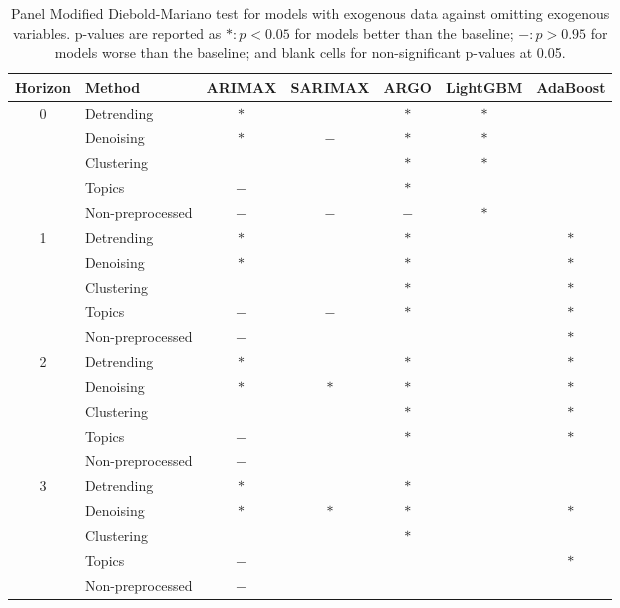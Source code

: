 \begin{table}[H]
\centering
\begin{tabular}{clccccc}
\toprule
Horizon & Method & ARIMAX & SARIMAX & ARGO & LightGBM & AdaBoost \\
\midrule
\multirow{5}{*}{0} & Detrending & $*$ &  & $*$ & $*$ &  \\
 & Denoising & $*$ & $-$ & $*$ & $*$ &  \\
 & Clustering &  &  & $*$ & $*$ &  \\
 & Topics & $-$ &  & $*$ &  &  \\
 & Non-preprocessed & $-$ & $-$ & $-$ & $*$ &  \\
\midrule
\multirow{5}{*}{1} & Detrending & $*$ &  & $*$ &  & $*$ \\
 & Denoising & $*$ &  & $*$ &  & $*$ \\
 & Clustering &  &  & $*$ &  & $*$ \\
 & Topics & $-$ & $-$ & $*$ &  & $*$ \\
 & Non-preprocessed & $-$ &  &  &  & $*$ \\
\midrule
\multirow{5}{*}{2} & Detrending & $*$ &  & $*$ &  & $*$ \\
 & Denoising & $*$ & $*$ & $*$ &  & $*$ \\
 & Clustering &  &  & $*$ &  & $*$ \\
 & Topics & $-$ &  & $*$ &  & $*$ \\
 & Non-preprocessed & $-$ &  &  &  &  \\
\midrule
\multirow{5}{*}{3} & Detrending & $*$ &  & $*$ &  &  \\
 & Denoising & $*$ & $*$ & $*$ &  & $*$ \\
 & Clustering &  &  & $*$ &  &  \\
 & Topics & $-$ &  &  &  & $*$ \\
 & Non-preprocessed & $-$ &  &  &  &  \\
\bottomrule
\end{tabular}
\vspace{5pt}
\caption{Panel Modified Diebold-Mariano test for models with exogenous data against omitting exogenous variables. p-values are reported as $*:  p < 0.05$ for models better than the baseline; $-: p > 0.95$ for models worse than the baseline; and blank cells for non-significant p-values at 0.05.}
\label{tab:panel_dm}
\end{table}

